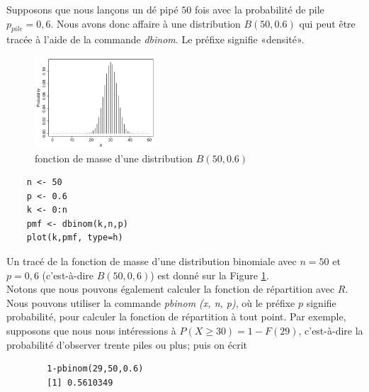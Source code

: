 {\begin{example}\label{ex:2.5}
    Supposons que nous lançons un dé pipé $50$ fois avec la probabilité de pile $p_ {pile} = 0,6$.
    Nous avons donc affaire à une distribution $B(50,0.6)$ qui peut être tracée à l'aide de la commande \emph{dbinom}.
    Le préfixe  signifie «densité».


\begin{figure}
    \caption{fonction de masse d'une distribution $B(50, 0.6)$}
    \label{fig:binomplot}
    \includegraphics[width=0.4\textwidth]{content/binomplot.PNG}
\end{figure}

\begin{verbatim}
    n <- 50
    p <- 0.6
    k <- 0:n
    pmf <- dbinom(k,n,p)
    plot(k,pmf, type=h)
\end{verbatim}

    Un tracé de la fonction de masse d'une distribution binomiale avec $ n = 50 $ et $ p = 0,6 $
    (c'est-à-dire $ B (50,0,6) $) est donné sur la Figure \ref{fig:binomplot}.\\
    Notons que nous pouvons également calculer la fonction de répartition avec $ R $. Nous pouvons utiliser la
    commande \textit {pbinom (x, n, p)}, où le préfixe $ p $ signifie probabilité, pour calculer la fonction de
    répartition à tout point. Par exemple, supposons que nous nous intéressions à $ P (X \geq 30) = 1 - F (29) $,
    c'est-à-dire la probabilité d'observer trente piles ou plus; puis on écrit

    \begin{verbatim}
        1-pbinom(29,50,0.6)
        [1] 0.5610349
    \end{verbatim}


\end{example}}
